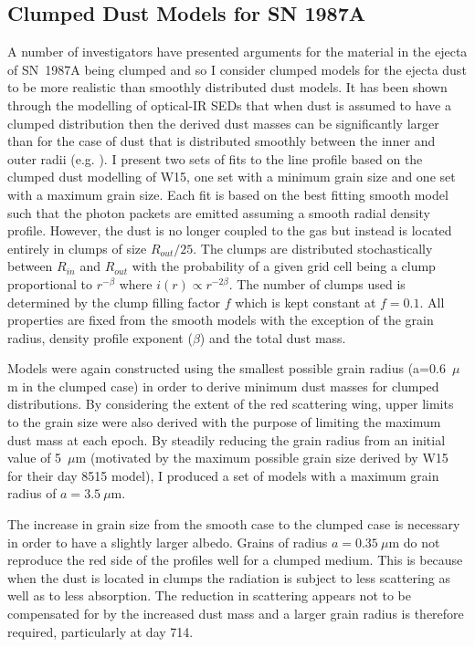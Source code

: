 \subsection{Clumped Dust Models for SN 1987A}
\label{clumped_models}

A number of investigators have presented arguments for the material in the 
ejecta of SN~1987A being clumped \citep{Lucy1991,Li1992,Kozma1998b} and so 
I consider clumped models for the ejecta dust to be more realistic than 
smoothly distributed dust models. It has been shown through the modelling 
of optical-IR SEDs that when dust is assumed to have a clumped 
distribution then the derived dust masses can be significantly larger than 
for the case of dust that is distributed smoothly between the inner and 
outer radii (e.g. \citet{Ercolano2007,Owen2015}). I present two sets of 
fits to the line profile based on the clumped dust modelling of W15, one 
set with a minimum grain size and one set with a maximum grain size.  
Each fit is based on the best fitting smooth model such that the photon 
packets are emitted assuming a smooth radial density profile.  However, 
the dust is no longer coupled to the gas but instead is located entirely 
in clumps of size $R_{out}/25$.  The clumps are distributed stochastically 
between $R_{in}$ and $R_{out}$ with the probability of a given grid cell 
being a clump proportional to $r^{- \beta }$ where $i(r) \propto r^{-2 
\beta}$.  The number of clumps used is determined by the clump filling 
factor $f$ which is kept constant at $f=0.1$.  All properties are fixed 
from the smooth models with the exception of the grain radius, density 
profile exponent ($\beta$) and the total dust mass.

Models were again constructed using the smallest possible grain radius (a=0.6~$\mu$m in the clumped case) in order to derive minimum dust masses 
for clumped distributions.  By considering the extent of the red 
scattering wing, upper limits to the grain size were also derived with the 
purpose of limiting the maximum dust mass at each epoch.  By steadily 
reducing the grain radius from an initial value of 5~$\mu$m (motivated by 
the maximum possible grain size derived by W15 for their day 8515 model), 
I produced a set of models with a maximum grain radius of $a=3.5~\mu$m.  

The increase in grain size from the smooth case to the clumped case is 
necessary in order to have a slightly larger albedo.  Grains of radius 
$a=0.35~\mu$m do not reproduce the red side of the profiles well for a 
clumped medium.  This is because when the dust is located in clumps the 
radiation is subject to less scattering as well as to less absorption.  
The reduction in scattering appears not to be compensated for by the 
increased dust mass and a larger grain radius is therefore required, 
particularly at day 714.

